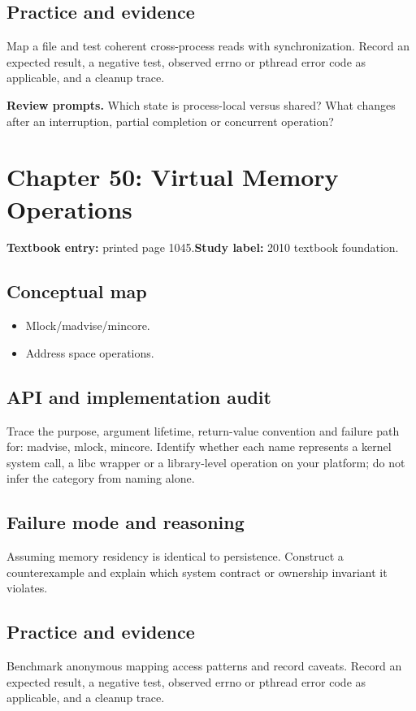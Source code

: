 \documentclass[11pt,letterpaper,oneside]{report}
\begin{document}
\subsection{Practice and evidence}
Map a file and test coherent cross-process reads with synchronization. Record an expected result, a negative test, observed errno or pthread error code as applicable, and a cleanup trace.

\textbf{Review prompts.} Which state is process-local versus shared? What changes after an interruption, partial completion or concurrent operation?

\section{Chapter 50: Virtual Memory Operations}
\textbf{Textbook entry:} printed page 1045.\quad \textbf{Study label:} 2010 textbook foundation.

\subsection{Conceptual map}
\begin{itemize}
\item Mlock/madvise/mincore.
\item Address space operations.
\end{itemize}
\subsection{API and implementation audit}
Trace the purpose, argument lifetime, return-value convention and failure path for: madvise, mlock, mincore. Identify whether each name represents a kernel system call, a libc wrapper or a library-level operation on your platform; do not infer the category from naming alone.

\subsection{Failure mode and reasoning}
Assuming memory residency is identical to persistence. Construct a counterexample and explain which system contract or ownership invariant it violates.

\subsection{Practice and evidence}
Benchmark anonymous mapping access patterns and record caveats. Record an expected result, a negative test, observed errno or pthread error code as applicable, and a cleanup trace.
\end{document}
